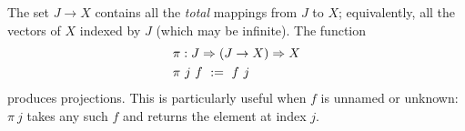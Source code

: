 The set $J \to X$ contains all the \emph{total} mappings from $J$ to $X$; equivalently, all the vectors of $X$ indexed by $J$ (which may be infinite).
The function
\begin{equation}
\begin{aligned}
	&\pi : J \Rightarrow (J \to X) \Rightarrow X \\
	&\pi~j~f \ := \ f~j
\end{aligned}
\end{equation}
produces projections.
This is particularly useful when $f$ is unnamed or unknown: $\pi~j$ takes any such $f$ and returns the element at index $j$.


